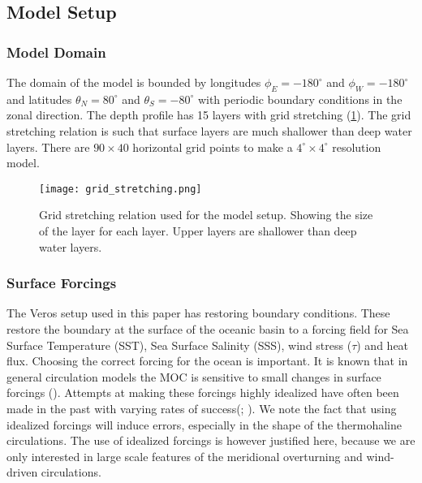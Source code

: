 
\subsection{Model Setup}
\subsubsection{Model Domain}
The domain of the model is bounded by longitudes $\phi_E=-180^{\circ}$ and $\phi_W=-180^{\circ}$ and latitudes $\theta_N=80^{\circ}$ and $\theta_S=-80^{\circ}$ with periodic boundary conditions in the zonal direction.
 The depth profile has 15 layers with grid stretching (\cref{fig:gridstrech}). The grid stretching relation is such that surface layers are much shallower than deep water layers. There are $90 \times 40$ horizontal grid points to make a $4^{\circ} \times 4^{\circ}$ resolution model.
 
 \begin{figure}[H]
 	\texttt{[image: grid\_stretching.png]}
 	\caption{Grid stretching relation used for the model setup. Showing the size of the layer for each layer. Upper layers are shallower than deep water layers.}
 	\label{fig:gridstrech}
 \end{figure}

\subsubsection{Surface Forcings}\label{sec:forcing_ideal}
The Veros setup used in this paper has restoring boundary conditions. These restore the boundary at the surface of the oceanic basin to a forcing field for Sea Surface Temperature (SST), Sea Surface Salinity (SSS), wind stress ($\tau$) and heat flux.
Choosing the correct forcing for the ocean is important. It is known that in general circulation models the MOC is sensitive to small changes in surface forcings (\cite{Milliff1999May}). Attempts at making these forcings highly idealized have often been made in the past with varying rates of success(\cite{bryan1987parameter}; \cite{Mulder2017Jul}). We note the fact that using idealized forcings will induce errors, especially in the shape of the thermohaline circulations. The use of idealized forcings is however justified here, because we are only interested in large scale features of the meridional overturning and wind-driven circulations.

